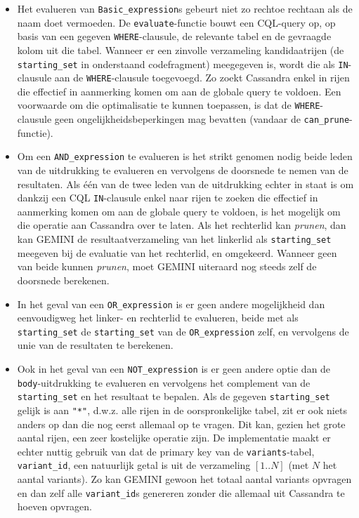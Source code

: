 \begin{itemize}
\item Het evalueren van \texttt{Basic\_expression}s gebeurt niet zo rechtoe rechtaan als de naam doet vermoeden. De \texttt{evaluate}-functie bouwt een CQL-query op, op basis van een gegeven \texttt{WHERE}-clausule, de relevante tabel en de gevraagde kolom uit die tabel. Wanneer er een zinvolle verzameling kandidaatrijen (de \texttt{starting\_set} in onderstaand codefragment) meegegeven is, wordt die als \texttt{IN}-clausule aan de \texttt{WHERE}-clausule toegevoegd. Zo zoekt Cassandra enkel in rijen die effectief in aanmerking komen om aan de globale query te voldoen. Een voorwaarde om die optimalisatie te kunnen toepassen, is dat de \texttt{WHERE}-clausule geen ongelijkheidsbeperkingen mag bevatten (vandaar de \texttt{can\_prune}-functie).



\item Om een \texttt{AND\_expression} te evalueren is het strikt genomen nodig beide leden van de uitdrukking te evalueren en vervolgens de doorsnede te nemen van de resultaten. Als \'e\'en van de twee leden van de uitdrukking echter in staat is om dankzij een CQL \texttt{IN}-clausule enkel naar rijen te zoeken die effectief in aanmerking komen om aan de globale query te voldoen, is het mogelijk om die operatie aan Cassandra over te laten. Als het rechterlid kan \textit{prunen}, dan kan GEMINI de resultaatverzameling van het linkerlid als \texttt{starting\_set} meegeven bij de evaluatie van het rechterlid, en omgekeerd. Wanneer geen van beide kunnen \textit{prunen}, moet GEMINI uiteraard nog steeds zelf de doorsnede berekenen.



\item In het geval van een \texttt{OR\_expression} is er geen andere mogelijkheid dan eenvoudigweg het linker- en rechterlid te evalueren, beide met als \texttt{starting\_set} de \texttt{starting\_set} van de \texttt{OR\_expression} zelf, en vervolgens de unie van de resultaten te berekenen.

\item Ook in het geval van een \texttt{NOT\_expression} is er geen andere optie dan de \texttt{body}-uitdrukking te evalueren en vervolgens het complement van de \texttt{starting\_set} en het resultaat te bepalen. Als de gegeven \texttt{starting\_set} gelijk is aan \texttt{"*"}, d.w.z. alle rijen in de oorspronkelijke tabel, zit er ook niets anders op dan die nog eerst allemaal op te vragen. Dit kan, gezien het grote aantal rijen, een zeer kostelijke operatie zijn. De implementatie maakt er echter nuttig gebruik van dat de primary key van de \texttt{variants}-tabel, \texttt{variant\_id}, een natuurlijk getal is uit de verzameling $[1..N]$ (met $N$ het aantal variants). Zo kan GEMINI gewoon het totaal aantal variants opvragen en dan zelf alle \texttt{variant\_id}s genereren zonder die allemaal uit Cassandra te hoeven opvragen.


\end{itemize}
